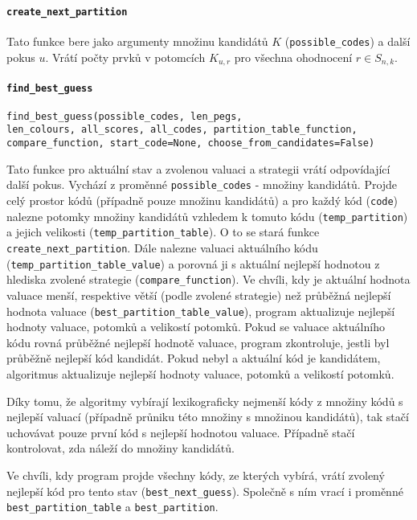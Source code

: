 \documentclass[12pt,a4paper]{article}
\begin{document}
\paragraph{\texttt{create\_next\_partition}}
Tato funkce bere jako argumenty množinu kandidátů $K$ (\texttt{possible\_codes}) a další pokus $u$. Vrátí počty prvků v potomcích $K_{u,r}$ pro všechna ohodnocení $r \in S_{n,k}$.

\paragraph{\texttt{find\_best\_guess}}
\texttt{find\_best\_guess(possible\_codes, len\_pegs,}\\
\texttt{len\_colours, all\_scores, all\_codes, partition\_table\_function,}\\
\texttt{compare\_function, start\_code=None, choose\_from\_candidates=False)}

Tato funkce pro aktuální stav a zvolenou valuaci a strategii vrátí odpovídající další pokus. Vychází z proměnné \texttt{possible\_codes} - množiny kandidátů. Projde celý prostor kódů (případně pouze množinu kandidátů) a pro každý kód (\texttt{code}) nalezne potomky množiny kandidátů vzhledem k tomuto kódu (\texttt{temp\_partition}) a jejich velikosti (\texttt{temp\_partition\_table}). O to se stará funkce \texttt{create\_next\_partition}. Dále nalezne valuaci aktuálního kódu (\texttt{temp\_partition\_table\_value}) a porovná ji s aktuální nejlepší hodnotou z hlediska zvolené strategie (\texttt{compare\_function}). Ve chvíli, kdy je aktuální hodnota valuace menší, respektive větší (podle zvolené strategie) než průběžná nejlepší hodnota valuace (\texttt{best\_partition\_table\_value}), program aktualizuje nejlepší hodnoty valuace, potomků a velikostí potomků. Pokud se valuace aktuálního kódu rovná průběžné nejlepší hodnotě valuace, program zkontroluje, jestli byl průběžně nejlepší kód kandidát. Pokud nebyl a aktuální kód je kandidátem, algoritmus aktualizuje nejlepší hodnoty valuace, potomků a velikostí potomků. 

Díky tomu, že algoritmy vybírají lexikograficky nejmenší kódy z množiny kódů s nejlepší valuací (případně průniku této množiny s množinou kandidátů), tak stačí uchovávat pouze první kód s nejlepší hodnotou valuace. Případně stačí kontrolovat, zda náleží do množiny kandidátů.

Ve chvíli, kdy program projde všechny kódy, ze kterých vybírá, vrátí zvolený nejlepší kód pro tento stav (\texttt{best\_next\_guess}). Společně s ním vrací i proměnné \texttt{best\_partition\_table} a \texttt{best\_partition}. 
\end{document}
